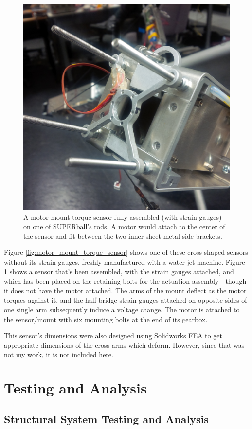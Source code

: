 \documentclass[12pt]{report}
\begin{document}
\begin{figure}[thpb]
      \centering
      \includegraphics[width=.5\columnwidth]{img/sensor_onrod.jpg}
      \caption{A motor mount torque sensor fully assembled (with strain gauges) on one of SUPERball's rods. A motor would attach to the center of the sensor and fit between the two inner sheet metal side brackets.}
      \label{fig:motor_mount_torque_sensor_assembled}
      \vspace{-0.2cm}
\end{figure}

Figure \ref{fig:motor_mount_torque_sensor} shows one of these cross-shaped sensors without its strain gauges, freshly manufactured with a water-jet machine.
Figure \ref{fig:motor_mount_torque_sensor_assembled} shows a sensor that's been assembled, with the strain gauges attached, and which has been placed on the retaining bolts for the actuation assembly - though it does not have the motor attached.
The arms of the mount deflect as the motor torques against it, and the half-bridge strain gauges attached on opposite sides of one single arm subsequently induce a voltage change.
The motor is attached to the sensor/mount with six mounting bolts at the end of its gearbox.

This sensor's dimensions were also designed using Solidworks FEA to get appropriate dimensions of the cross-arms which deform.
However, since that was not my work, it is not included here.



\chapter{Testing and Analysis}

\section{Structural System Testing and Analysis}\label{sec:hardware_testing}
\end{document}
